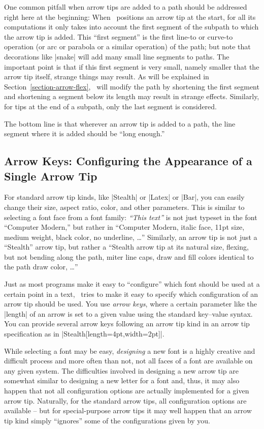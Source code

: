 One common pitfall when arrow tips are added to a path should be
addressed right here at the beginning: When \tikzname\ positions an
arrow tip at the start, for all its computations it only takes into
account the first segment of the subpath to which the arrow tip is
added. This ``first segment'' is the first line-to or curve-to operation (or arc
or parabola or a similar operation) of the path; but note that
decorations like |snake| will add many small line segments to
paths. The important point 
is that if this first segment is very small, namely smaller that the
arrow tip itself, strange things may result. As will be explained in
Section~\ref{section-arrow-flex}, \tikzname\ will modify the path by
shortening the first segment and shortening a segment below its length
may result in strange effects. Similarly, for tips at the end of a
subpath, only the last segment is considered.

The bottom line is that wherever an arrow tip is added to a path, the
line segment where it is added should be ``long enough.'' 


\subsection{Arrow Keys: Configuring the Appearance of a Single Arrow Tip}
\label{section-arrow-config}

For standard arrow tip kinds, like |Stealth| or |Latex| or |Bar|, 
you can easily change their size, aspect ratio, color, and other
parameters. This is similar to selecting a font face from a font
family: \emph{``This text''} is not just typeset in the font 
``Computer Modern,'' but rather in ``Computer Modern, italic face,
11pt size, medium weight, black color, no underline, \dots''
Similarly, an arrow tip is not just a ``Stealth'' arrow tip, but
rather a ``Stealth arrow tip at its natural size, flexing, but not
bending along the path, miter line caps, draw and fill colors
identical to the path draw color, \dots''

Just as most programs make it easy to ``configure'' which font should
be used at a certain point in a text, \tikzname\ tries to make it easy
to specify which configuration of an arrow tip should be used. You use
\emph{arrow keys}, where a certain parameter like the |length| of an
arrow is set to a given value using the standard key--value
syntax. You can provide several arrow keys following an arrow tip kind
in  an arrow tip specification as in
|Stealth[length=4pt,width=2pt]|.

While selecting a font may be easy, \emph{designing} a new font is a
highly creative and difficult process and more often than not, not all
faces of a font are available on any given system. The difficulties
involved in designing a new arrow tip are somewhat similar to designing a new
letter for a font and, thus, it may also happen that not all
configuration options are actually implemented for a given arrow
tip. Naturally, for the standard arrow tips, all configuration options
are available -- but for special-purpose arrow tips it may well happen
that an arrow tip kind simply ``ignores'' some of the configurations
given by you.

